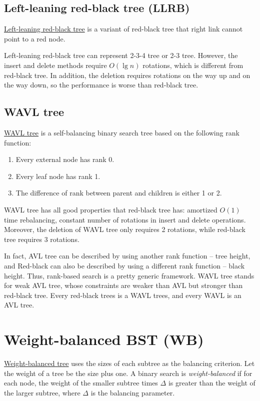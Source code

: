 \subsection{Left-leaning red-black tree (LLRB)}
\href{https://en.wikipedia.org/wiki/Left-leaning_red%E2%80%93black_tree}{Left-leaning red-black tree} is a variant of red-black tree that right link cannot point to a red node.

Left-leaning red-black tree can represent 2-3-4 tree or 2-3 tree. However, the insert and delete methods require $O(\lg n)$ rotations, which is different from red-black tree. In addition, the deletion requires rotations on the way up and on the way down, so the performance is worse than red-black tree.

\subsection{WAVL tree}
\href{https://en.wikipedia.org/wiki/WAVL_tree}{WAVL tree} is a self-balancing binary search tree based on the following rank function:
\begin{enumerate}
    \item Every external node has rank 0.
    \item Every leaf node has rank 1.
    \item The difference of rank between parent and children is either 1 or 2.
\end{enumerate}

WAVL tree has all good properties that red-black tree has: amortized $O(1)$ time rebalancing, constant number of rotations in insert and delete operations. Moreover, the deletion of WAVL tree only requires 2 rotations, while red-black tree requires 3 rotations.

In fact, AVL tree can be described by using another rank function -- tree height, and Red-black can also be described by using a different rank function -- black height. Thus, rank-based search is a pretty generic framework. WAVL tree stands for weak AVL tree, whose constraints are weaker than AVL but stronger than red-black tree. Every red-black trees is a WAVL trees, and every WAVL is an AVL tree.


\section{Weight-balanced BST (WB)}
\href{https://en.wikipedia.org/wiki/Weight-balanced_tree}{Weight-balanced tree} uses the sizes of each subtree as the balancing criterion. Let the weight of a tree be the size plus one. A binary search is \emph{weight-balanced} if for each node, the weight of the smaller subtree times $\Delta$ is greater than the weight of the larger subtree, where $\Delta$ is the balancing parameter.

